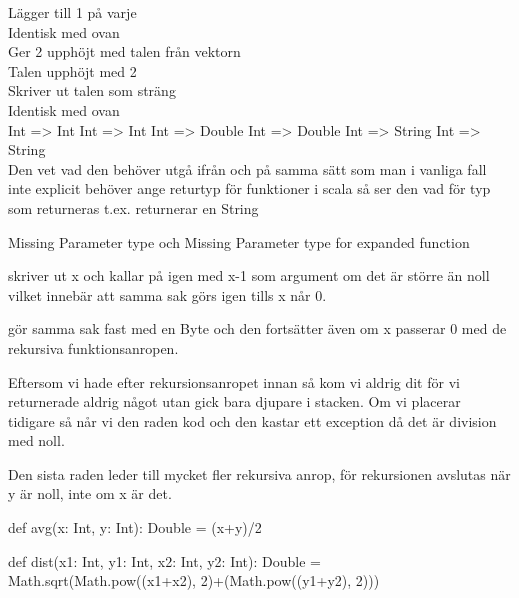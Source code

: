 \Task

\Subtask
{} Lägger till 1 på varje\\
 Identisk med ovan\\
 Ger 2 upphöjt med talen från vektorn\\
 Talen upphöjt med 2\\
 Skriver ut talen som sträng\\
 Identisk med ovan\\

\Subtask
Int => Int 
Int => Int
Int => Double
Int => Double
Int => String
Int => String \\
Den vet vad den behöver utgå ifrån och på samma sätt som man i vanliga fall inte explicit behöver ange returtyp för funktioner i scala så ser den vad för typ som returneras t.ex.  returnerar en String

\Subtask
Missing Parameter type och Missing Parameter type for expanded function

\Task

\Subtask
{} skriver ut x och kallar på  igen med x-1 som argument om det är större än noll vilket innebär att samma sak görs igen tills x når 0.

 gör samma sak fast med en Byte och den fortsätter även om x passerar 0 med de rekursiva funktionsanropen.

\Subtask
Eftersom vi hade  efter rekursionsanropet innan så kom vi aldrig dit för vi returnerade aldrig något utan gick bara djupare i stacken. Om vi placerar  tidigare så når vi den raden kod och den kastar ett exception då det är division med noll.

\Subtask
Den sista raden leder till mycket fler rekursiva anrop, för rekursionen avslutas när y är noll, inte om x är det.

\Task
\begin{REPL}
def avg(x: Int, y: Int): Double = (x+y)/2
\end{REPL}

\Task
\begin{REPL}
def dist(x1: Int, y1: Int, x2: Int, y2: Int): Double = 
 Math.sqrt(Math.pow((x1+x2), 2)+(Math.pow((y1+y2), 2)))
\end{REPL}









